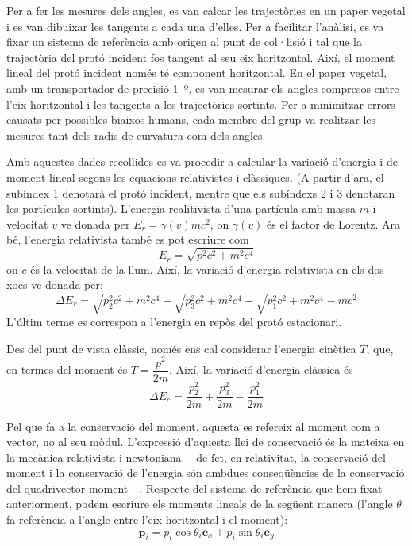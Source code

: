 \documentclass[12pt]{article}
\begin{document}
Per a fer les mesures dels angles, es van calcar les trajectòries en un paper vegetal i es van dibuixar les tangents a cada una d'elles. Per a facilitar l'anàlisi, es va fixar un sistema de referència amb origen al punt de col·lisió i tal que la trajectòria del protó incident fos tangent al seu eix horitzontal. Així, el moment lineal del protó incident només té component horitzontal. En el paper vegetal, amb un transportador de precisió \SI{1}{º}, es van mesurar els angles compresos entre l'eix horitzontal i les tangents a les trajectòries sortints. Per a minimitzar errors causats per possibles biaixos humans, cada membre del grup va realitzar les mesures tant dels radis de curvatura com dels angles.

Amb aquestes dades recollides es va procedir a calcular la variació d'energia i de moment lineal segons les equacions relativistes i clàssiques. (A partir d'ara, el subíndex 1 denotarà el protó incident, mentre que els subíndexs 2 i 3 denotaran les partícules sortints). L'energia realitivista d'una partícula amb massa \( m \) i velocitat \( v \) ve donada per \( E_{r} = \gamma(v)mc^{2} \), on \( \gamma(v) \) és el factor de Lorentz. Ara bé, l'energia relativista també es pot escriure com 
\begin{equation}
  E_{r} = \sqrt{p^{2}c^{2} + m^{2}c^{4}}
\end{equation}
on \( c \) és la velocitat de la llum. Així, la variació d'energia relativista en els dos xocs ve donada per:
\begin{equation}
  \Delta E_{r} = \sqrt{p_{2}^{2}c^{2} + m^{2}c^{4}} + \sqrt{p_{3}^{2}c^{2} + m^{2}c^{4}} - \sqrt{p_{1}^{2}c^{2} + m^{2}c^{4}} - mc^{2}
\end{equation}
L'últim terme es correspon a l'energia en repòs del protó estacionari.

Des del punt de vista clàssic, només ens cal considerar l'energia cinètica \( T \), que, en termes del moment és \( T = \dfrac{p^{2}}{2m} \). Així, la variació d'energia clàssica és
\begin{equation}
  \Delta E_{c} = \dfrac{p_{2}^{2}}{2m} + \dfrac{p^{2}_{3}}{2m} - \dfrac{p^{2}_{1}}{2m}
\end{equation}

Pel que fa a la conservació del moment, aquesta es refereix al moment com a vector, no al seu mòdul. L'expressió d'aquesta llei de conservació és la mateixa en la mecànica relativista i newtoniana ---de fet, en relativitat, la conservació del moment i la conservació de l'energia són ambdues conseqüències de la conservació del quadrivector moment---. Respecte del sistema de referència que hem fixat anteriorment, podem escriure els moments lineals de la següent manera (l'angle \( \theta \) fa referència a l'angle entre l'eix horitzontal i el moment):
\begin{equation}
\mathbf{p}_{i} = p_{i}\cos{\theta_{i}}\mathbf{e}_{x} + p_{i}\sin{\theta_{i}}\mathbf{e}_{y}
\end{equation}
\end{document}
